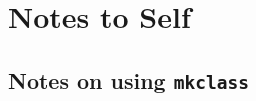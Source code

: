 \documentclass{aastex6}
\begin{document}









\clearpage
\pagebreak

\appendix

\section{Notes to Self}

\subsection{Notes on using \texttt{mkclass}}
\end{document}
